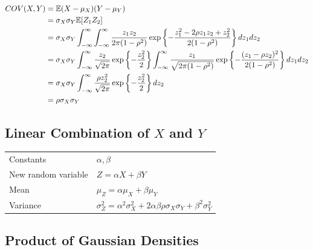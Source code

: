 \begin{align*}
    COV(X,Y)
    &= \mathbb{E}(X - \mu_X)(Y - \mu_Y) \\
    &= \sigma_X \sigma_Y \mathbb{E}[Z_1Z_2] \\
    &= \sigma_X \sigma_Y \displaystyle\int_{-\infty}^{\infty}
        \displaystyle\int_{-\infty}^{\infty} 
        \dfrac{z_1 z_2}{2\pi (1 - \rho^2)}
        \exp\left\{ 
            -\dfrac{z_1^2 - 2\rho z_1 z_2 + z_2^2}{2(1-\rho^2)}
        \right\}
        dz_1 dz_2 \\
    &= \sigma_X \sigma_Y 
        \displaystyle\int_{-\infty}^{\infty} \dfrac{z_2}{\sqrt{2\pi}}
        \exp \left\{- \dfrac{z_2^2}{2}\right\}
        \displaystyle\int_{-\infty}^{\infty}
        \dfrac{z_1}{\sqrt{2\pi(1-\rho^2)}}
        \exp \left\{ -\dfrac{(z_1 - \rho z_2)^2}{2(1- \rho^2)}\right\} dz_1 dz_2 \\
    &= \sigma_X \sigma_Y \displaystyle\int_{-\infty}^{\infty}
        \dfrac{\rho z_2^2}{\sqrt{2\pi}}
        \exp \left\{- \dfrac{z_2^2}{2}\right\} d z_2 \\
    &= \rho \sigma_X \sigma_Y
\end{align*}


\subsection{Linear Combination of $X$ and $Y$ \cite{ism-1}} \label{Normal distribution: Bivariate/ Multivariate: linear combination}

\begin{table}[H]
    \centering
    \begin{tabular}{l l}
        Constants & $\alpha, \beta$ \\
    
        New random variable & $Z = \alpha X + \beta Y$ \\

        Mean & $\mu_Z = \alpha \mu_X + \beta \mu_Y$ \\

        Variance & $
            \sigma_Z^2 
            = \alpha^2 \sigma^2_X 
            + 2\alpha\beta\rho\sigma_X\sigma_Y 
            + \beta^2 \sigma^2_Y
        $ \\

    \end{tabular}

\end{table}


\subsection{Product of Gaussian Densities \cite{mfml-1}}\label{Product of Gaussian Densities}

